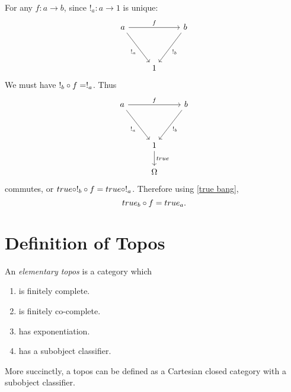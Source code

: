     \begin{exercise}
        For any $f : a \to b$, since $!_a : a \to 1$ is unique:
        \[\begin{tikzcd}
            {a} && {b} \\
            \\
            & {1}
            \arrow["{!_b}", from=1-3, to=3-2]
            \arrow["{f}", from=1-1, to=1-3]
            \arrow["{!_a}"', from=1-1, to=3-2]
        \end{tikzcd}\]
        We must have $!_b \circ f = !_a$. Thus
        \[\begin{tikzcd}
            {a} && {b} \\
            \\
            & {1} \\
            & {\Omega}
            \arrow["{!_b}", from=1-3, to=3-2]
            \arrow["{f}", from=1-1, to=1-3]
            \arrow["{!_a}"', from=1-1, to=3-2]
            \arrow["{true}", from=3-2, to=4-2]
        \end{tikzcd}\]
        commutes, or  $true \circ !_b \circ f = true \circ !_a$. Therefore using \cref{true bang},
        $$true_b \circ f = true_a.$$
    \end{exercise}

\section{Definition of Topos}
    \begin{defi}
        An \emph{elementary topos} is a category which
        \begin{enumerate}
            \item is finitely complete.
            \item is finitely co-complete.
            \item has exponentiation.
            \item has a subobject classifier.
        \end{enumerate}
    \end{defi}

    \begin{fact}
        More succinctly, a topos can be defined as a Cartesian closed category with a subobject classifier.
    \end{fact}